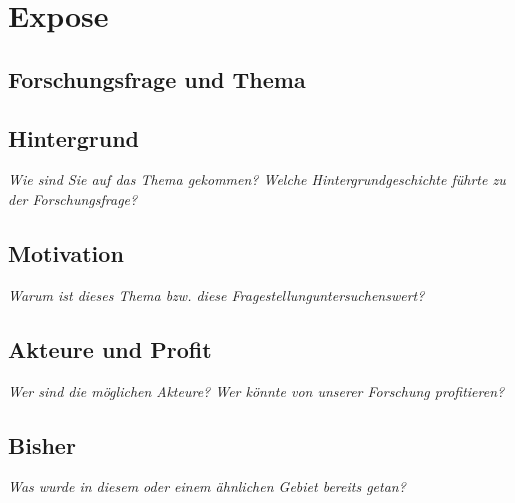 \chapter{Expose}
\section{Forschungsfrage und Thema}

\section{Hintergrund}
{\scriptsize \textit{Wie sind Sie auf das Thema gekommen? Welche Hintergrundgeschichte führte zu der Forschungsfrage?}}

\section{Motivation}
{\scriptsize \textit{Warum ist dieses Thema bzw. diese Fragestellunguntersuchenswert?}}

\section{Akteure und Profit}
{\scriptsize \textit{Wer sind die möglichen Akteure? Wer könnte von unserer Forschung profitieren?}}

\section{Bisher}
{\scriptsize \textit{Was wurde in diesem oder einem ähnlichen Gebiet bereits getan?}}